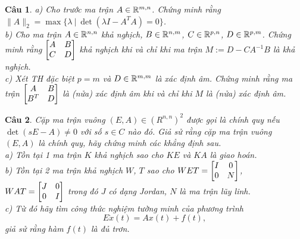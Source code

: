 \documentclass[11pt]{article}
\newtheorem{bt}{Câu}
\begin{document}

\begin{bt}
a) Cho trước ma trận $A \in \mathbb{R}^{m,n}$. Chứng minh rằng $\|A\|_2 = \max\{\lambda \ | \ \det(\lambda I - A^TA) = 0 \}$. \\
b) Cho ma trận $A \in \mathbb{R}^{n,n}$ khả nghịch, $B \in \mathbb{R}^{n,m}$, $C \in \mathbb{R}^{p,n}$, $D \in \mathbb{R}^{p,m}$. Chứng minh rằng $\begin{bmatrix} A & B \\ C & D \end{bmatrix}$ khả nghịch khi và chỉ khi ma trận $M := D - CA^{-1}B$ là khả nghịch. \\
c) Xét TH đặc biệt $p = m$ và $D \in \mathbb{R}^{m,m}$ là xác định âm. Chứng minh rằng ma trận $\begin{bmatrix} A & B \\ B^T & D \end{bmatrix}$ là (nửa) xác định âm khi và chỉ khi $M$ là (nửa) xác định âm.
\end{bt}


\begin{bt}
Cặp ma trận vuông $(E,A) \in (R^{n,n})^2$ được gọi là chính quy nếu $\det(sE-A) \not= 0$ với số $s\in C$ nào đó. Giả sử rằng cặp ma trận vuông $(E,A)$ là chính quy, hãy chứng minh các khẳng định sau. \\
a) Tồn tại 1 ma trận $K$ khả nghịch sao cho $KE$ và $KA$ là giao hoán. \\
b) Tồn tại 2 ma trận khả nghịch $W$, $T$ sao cho $WET = \begin{bmatrix} I & 0 \\ 0 & N \end{bmatrix}$, $WAT = \begin{bmatrix} J & 0\\ 0 & I \end{bmatrix}$ trong đó $J$ có dạng Jordan, $N$ là ma trận lũy linh. \\
c) Từ đó hãy tìm công thức nghiệm tường minh của phương trình 
%
\[
E \dot{x}(t) = A x(t) + f(t), 
\]
%
giả sử rằng hàm $f(t)$ là đủ trơn.
\end{bt}
\end{document}
